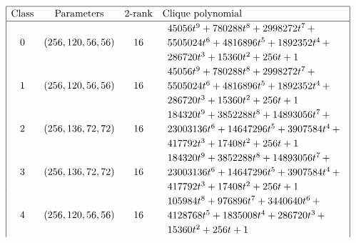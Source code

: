 \documentclass[12pt,a4paper]{article}
\begin{document}
\begin{table}[!bhpt] %
\small{}
\begin{align*}
\def\arraystretch{1.2}
\begin{array}{|cccl|}
\hline
\text{Class} &
\text{Parameters} &
\text{2-rank} &
\text{Clique polynomial}
\\
\hline
0 &
(256, 120, 56, 56) &
16 &
\begin{array}{l}
45056t^{9} + 780288t^{8} + 2998272t^{7}
\,+
\\
 5505024t^{6} + 4816896t^{5} + 1892352t^{4}
\,+
\\
 286720t^{3} + 15360t^{2} + 256t + 1
\end{array}
\\
1 &
(256, 120, 56, 56) &
16 &
\begin{array}{l}
45056t^{9} + 780288t^{8} + 2998272t^{7}
\,+
\\
 5505024t^{6} + 4816896t^{5} + 1892352t^{4}
\,+
\\
 286720t^{3} + 15360t^{2} + 256t + 1
\end{array}
\\
2 &
(256, 136, 72, 72) &
16 &
\begin{array}{l}
184320t^{9} + 3852288t^{8} + 14893056t^{7}
\,+
\\
 23003136t^{6} + 14647296t^{5} + 3907584t^{4}
\,+
\\
 417792t^{3} + 17408t^{2} + 256t + 1
\end{array}
\\
3 &
(256, 136, 72, 72) &
16 &
\begin{array}{l}
184320t^{9} + 3852288t^{8} + 14893056t^{7}
\,+
\\
 23003136t^{6} + 14647296t^{5} + 3907584t^{4}
\,+
\\
 417792t^{3} + 17408t^{2} + 256t + 1
\end{array}
\\
4 &
(256, 120, 56, 56) &
16 &
\begin{array}{l}
105984t^{8} + 976896t^{7} + 3440640t^{6}
\,+
\\
 4128768t^{5} + 1835008t^{4} + 286720t^{3}
\,+
\\
 15360t^{2} + 256t + 1
\end{array}
\\

\end{array}
\end{align*}
\end{table}
\end{document}
